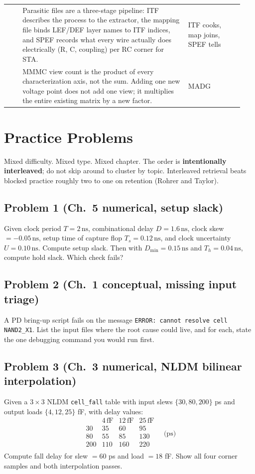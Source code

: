 \begin{tabular}{@{}p{0.06\linewidth} p{0.66\linewidth} p{0.22\linewidth}@{}}
\addlinespace
9 & Parasitic files are a three-stage pipeline: ITF describes the process to the extractor, the mapping file binds LEF/DEF layer names to ITF indices, and SPEF records what every wire actually does electrically (R, C, coupling) per RC corner for STA. & ITF cooks, map joins, SPEF tells \\
\addlinespace
10 & MMMC view count is the product of every characterization axis, not the sum. Adding one new voltage point does not add one view; it multiplies the entire existing matrix by a new factor. & MADG \\
\bottomrule
\end{tabular}

\chapter{Practice Problems}

Mixed difficulty. Mixed type. Mixed chapter. The order is \textbf{intentionally interleaved}; do not skip around to cluster by topic. Interleaved retrieval beats blocked practice roughly two to one on retention (Rohrer and Taylor).

\section*{Problem 1 (Ch.~5 numerical, setup slack)}
Given clock period $T = 2\,\text{ns}$, combinational delay $D = 1.6\,\text{ns}$, clock skew $= -0.05\,\text{ns}$, setup time of capture flop $T_s = 0.12\,\text{ns}$, and clock uncertainty $U = 0.10\,\text{ns}$. Compute setup slack. Then with $D_{\min} = 0.15\,\text{ns}$ and $T_h = 0.04\,\text{ns}$, compute hold slack. Which check fails?

\section*{Problem 2 (Ch.~1 conceptual, missing input triage)}
A PD bring-up script fails on the message \texttt{ERROR: cannot resolve cell NAND2\_X1}. List the input files where the root cause could live, and for each, state the one debugging command you would run first.

\section*{Problem 3 (Ch.~3 numerical, NLDM bilinear interpolation)}
Given a $3\times3$ NLDM \texttt{cell\_fall} table with input slews $\{30, 80, 200\}$ ps and output loads $\{4, 12, 25\}$ fF, with delay values:
\[
\begin{array}{c|ccc}
 & 4\,\text{fF} & 12\,\text{fF} & 25\,\text{fF} \\
\hline
30 & 35 & 60 & 95 \\
80 & 55 & 85 & 130 \\
200 & 110 & 160 & 220 \\
\end{array}
\quad \text{(ps)}
\]
Compute fall delay for slew $= 60$ ps and load $= 18$ fF. Show all four corner samples and both interpolation passes.

